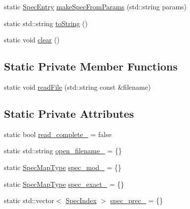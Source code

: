 \begin{DoxyCompactItemize}
\item 
static \hyperlink{structvt_1_1vrt_1_1collection_1_1balance_1_1_spec_entry}{Spec\+Entry} \hyperlink{structvt_1_1vrt_1_1collection_1_1balance_1_1_read_l_b_spec_a4a3fc33794511c6d74d6e4a70eb72682}{make\+Spec\+From\+Params} (std\+::string params)
\item 
static std\+::string \hyperlink{structvt_1_1vrt_1_1collection_1_1balance_1_1_read_l_b_spec_a2953391fdad20794e17de23b39ee2fad}{to\+String} ()
\item 
static void \hyperlink{structvt_1_1vrt_1_1collection_1_1balance_1_1_read_l_b_spec_aa92db6434f6eb0839312f914139d296c}{clear} ()
\end{DoxyCompactItemize}
\subsection*{Static Private Member Functions}
\begin{DoxyCompactItemize}
\item 
static void \hyperlink{structvt_1_1vrt_1_1collection_1_1balance_1_1_read_l_b_spec_a3e3d82556062c51ce3977727884400a4}{read\+File} (std\+::string const \&filename)
\end{DoxyCompactItemize}
\subsection*{Static Private Attributes}
\begin{DoxyCompactItemize}
\item 
static bool \hyperlink{structvt_1_1vrt_1_1collection_1_1balance_1_1_read_l_b_spec_af5c8b5f02b64bb47b59351d6facf465e}{read\+\_\+complete\+\_\+} = false
\item 
static std\+::string \hyperlink{structvt_1_1vrt_1_1collection_1_1balance_1_1_read_l_b_spec_af801f1e2bc280248d841f74d6afe012f}{open\+\_\+filename\+\_\+} = \{\}
\item 
static \hyperlink{structvt_1_1vrt_1_1collection_1_1balance_1_1_read_l_b_spec_aa73c3611c615832402eeeed6fb7b8049}{Spec\+Map\+Type} \hyperlink{structvt_1_1vrt_1_1collection_1_1balance_1_1_read_l_b_spec_a72033347ba73a23dd3494ead118e44d1}{spec\+\_\+mod\+\_\+} = \{\}
\item 
static \hyperlink{structvt_1_1vrt_1_1collection_1_1balance_1_1_read_l_b_spec_aa73c3611c615832402eeeed6fb7b8049}{Spec\+Map\+Type} \hyperlink{structvt_1_1vrt_1_1collection_1_1balance_1_1_read_l_b_spec_a40226a2163e4cc03bc48f766df0bb78d}{spec\+\_\+exact\+\_\+} = \{\}
\item 
static std\+::vector$<$ \hyperlink{namespacevt_1_1vrt_1_1collection_1_1balance_a72a5e0d9936ddf57f8e6c64e0e9fd123}{Spec\+Index} $>$ \hyperlink{structvt_1_1vrt_1_1collection_1_1balance_1_1_read_l_b_spec_a53d7c8950db9d6b4d8b7d895d0a264d0}{spec\+\_\+prec\+\_\+} = \{\}
\end{DoxyCompactItemize}


